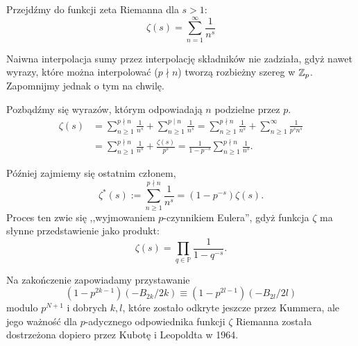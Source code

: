 Przejdźmy do funkcji zeta Riemanna dla $s > 1$:
\[
	\zeta(s) = \sum_{n = 1}^\infty \frac 1 {n^s}
\]

Naiwna interpolacja sumy przez interpolację składników nie zadziała, gdyż nawet wyrazy, które można interpolować ($p \nmid n$) tworzą rozbieżny szereg w $\mathbb Z_p$.
Zapomnijmy jednak o tym na chwilę.

Pozbądźmy się wyrazów, którym odpowiadają $n$ podzielne przez $p$.
\begin{align*}
\zeta(s) & = \sum_{n \ge 1}^{p \nmid n} \frac 1{n^s} + \sum_{n \ge 1}^{p \mid n} \frac 1{n^s}= \sum_{n \ge 1}^{p \nmid n} \frac 1{n^s} + \sum_{n \ge 1}^{\infty} \frac 1{p^sn^s} \\
& = \sum_{n \ge 1}^{p \nmid n} \frac{1}{n^s} + \frac{\zeta(s)}{p^s} = \frac{1}{1 - p^{-s}} \sum_{n \ge 1}^{p \nmid n} \frac 1{n^s}.
\end{align*}

Później zajmiemy się ostatnim członem,
\[
	\zeta^*(s) := \sum_{n \ge 1}^{p \nmid n} \frac 1{n^s} = \left ( 1 - p^{-s}\right) \zeta(s).
\]
Proces ten zwie się ,,wyjmowaniem $p$-czynnikiem Eulera'', gdyż funkcja $\zeta$ ma słynne przedstawienie jako produkt:
\[
	\zeta (s) = \prod_{q \in \mathbb P} \frac{1}{1 - q^{-s}}.
\]

Na zakończenie zapowiadamy przystawanie
\[
	(1 - p^{2k-1})(- B_{2k} / 2k) \equiv (1 - p^{2l-1})(-B_{2l}/2l)
\]
modulo $p^{N+1}$ i dobrych $k, l$, które zostało odkryte jeszcze przez Kummera, ale jego ważność dla $p$-adycznego odpowiednika funkcji $\zeta$ Riemanna została dostrzeżona dopiero przez Kubotę i Leopoldta w 1964.
